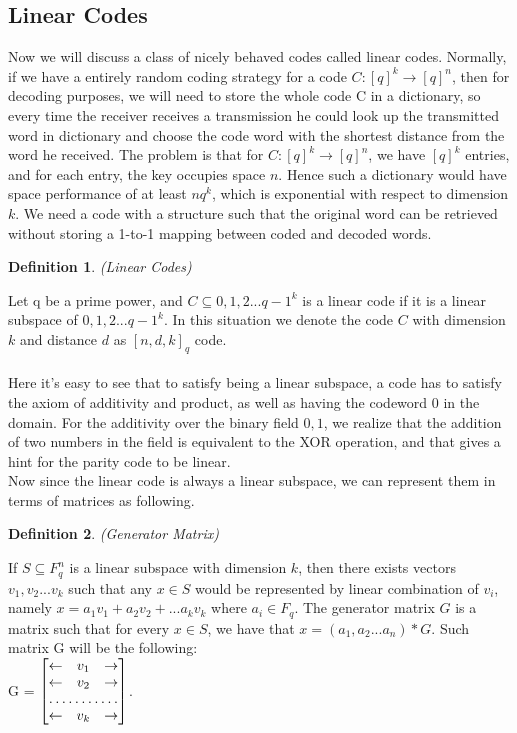 \documentclass{article}
\newtheorem{Definition}{Definition}
\begin{document}
\subsection{Linear Codes}
Now we will discuss a class of nicely behaved codes called linear codes. Normally, if we have a entirely random coding strategy for a code $C:[q]^k \rightarrow [q]^n$, then for decoding purposes, we will need to store the whole code C in a dictionary, so every time the receiver receives a transmission he could look up the transmitted word in dictionary and choose the code word with the shortest distance from the word he received. The problem is that for $C:[q]^k \rightarrow [q]^n$, we have $[q]^k$ entries, and for each entry, the key occupies space $n$. Hence such a dictionary would have space performance of at least $nq^k$, which is exponential with respect to dimension $k$. We need a code with a structure such that the original word can be retrieved without storing a 1-to-1 mapping between coded and decoded words.
\begin{Definition}(Linear Codes)\end{Definition}
\noindent Let q be a prime power, and $C \subseteq {0,1,2...q-1}^k$ is a linear code if it is a linear subspace of ${0,1,2...q-1}^k$. In this situation we denote the code $C$ with dimension $k$ and distance $d$ as $[n,d,k]_q$ code.\\\\
Here it's easy to see that to satisfy being a linear subspace, a code has to satisfy the axiom of additivity and product, as well as having the codeword 0 in the domain. For the additivity over the binary field ${0,1}$, we realize that the addition of two numbers in the field is equivalent to the XOR operation, and that gives a hint for the parity code to be linear.\\
Now since the linear code is always a linear subspace, we can represent them in terms of matrices as following.
\begin{Definition}(Generator Matrix)\end{Definition}
\noindent If $S \subseteq F_q^n$ is a linear subspace with dimension $k$, then there exists vectors $v_1, v_2...v_k$ such that any $x \in S$ would be represented by linear combination of $v_i$, namely $x = a_1v_1 + a_2v_2+ ... a_kv_k$ where $a_i \in F_q$. The generator matrix $G$ is a matrix such that for every $x \in S$, we have that $x = (a_1,a_2...a_n)*G$. Such matrix G will be the following:\\
G =
$\begin{bmatrix}
    \leftarrow       & v_1 & \rightarrow \\
    \leftarrow       & v_2 & \rightarrow \\
    \hdotsfor{3} \\
    \leftarrow       & v_k & \rightarrow
\end{bmatrix}$.
\end{document}
